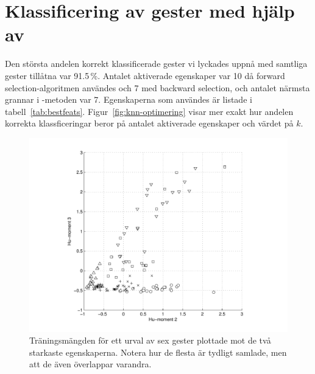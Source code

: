 \documentclass[../rapport_MVEX01-11-05]{subfiles}
\begin{document}
\section{Klassificering av gester med hjälp av \knn}
Den största andelen korrekt klassificerade gester vi lyckades uppnå
med samtliga gester tillåtna var 91.5\,\%. Antalet aktiverade
egenskaper var 10 då forward selection-algoritmen användes och 7 med
backward selection, och antalet närmsta grannar i \knn-metoden var 7. Egenskaperna som
användes är listade i
tabell~\vref{tab:bestfeats}. Figur~\vref{fig:knn-optimering} visar mer
exakt hur andelen korrekta
klassficeringar beror på antalet aktiverade egenskaper och värdet på $k$.

\begin{figure}[tbp]
  \centering
  \includegraphics[width=\textwidth,trim=2cm 0.5cm 2cm 0,clip=true]{bilder/feats-10+11}
  \caption{Träningsmängden för ett urval av sex gester plottade mot de två
	starkaste egenskaperna. Notera hur de flesta är tydligt samlade, men att
	de även överlappar varandra.}
  \label{fig:feats1011}
\end{figure}
\end{document}
